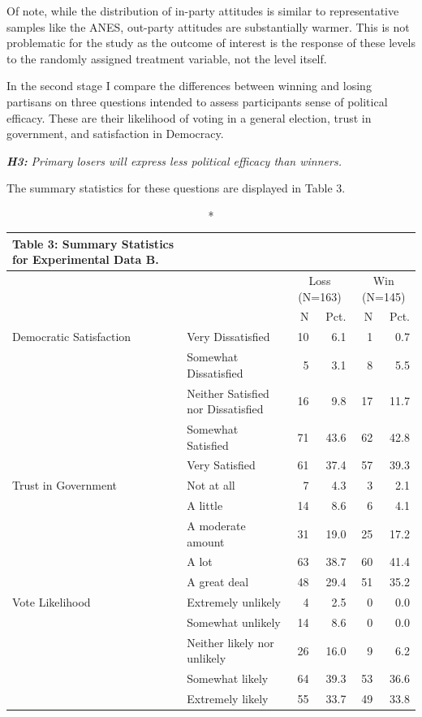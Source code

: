 \documentclass[
]{article}
\begin{document}
Of note, while the distribution of in-party attitudes is similar to representative samples like the ANES, out-party attitudes are substantially warmer. This is not problematic for the study as the outcome of interest is the response of these levels to the randomly assigned treatment variable, not the level itself.

In the second stage I compare the differences between winning and losing partisans on three questions intended to assess participants sense of political efficacy. These are their likelihood of voting in a general election, trust in government, and satisfaction in Democracy.

\textbf{\emph{H3:}} \emph{Primary losers will express less political efficacy than winners.}

The summary statistics for these questions are displayed in Table 3.

\clearpage

\captionsetup[table]{labelformat=empty,skip=1pt}
\begin{longtable}{llrrrr}
\caption*{
{\large \textbf{Table 3:} Summary Statistics for Experimental Data B.}
} \\ 
\toprule
 &  & \multicolumn{2}{c}{Loss (N=163)} & \multicolumn{2}{c}{Win (N=145)} \\ 
 \cmidrule(lr){3-4} \cmidrule(lr){5-6}
  &    & N & Pct. & N  & Pct.  \\ 
\midrule
Democratic Satisfaction & Very Dissatisfied & 10 & 6.1 & 1 & 0.7 \\ 
 & Somewhat Dissatisfied & 5 & 3.1 & 8 & 5.5 \\ 
 & Neither Satisfied nor Dissatisfied & 16 & 9.8 & 17 & 11.7 \\ 
 & Somewhat Satisfied & 71 & 43.6 & 62 & 42.8 \\ 
 & Very Satisfied & 61 & 37.4 & 57 & 39.3 \\ 
Trust in Government & Not at all & 7 & 4.3 & 3 & 2.1 \\ 
 & A little & 14 & 8.6 & 6 & 4.1 \\ 
 & A moderate amount & 31 & 19.0 & 25 & 17.2 \\ 
 & A lot & 63 & 38.7 & 60 & 41.4 \\ 
 & A great deal & 48 & 29.4 & 51 & 35.2 \\ 
Vote Likelihood & Extremely unlikely & 4 & 2.5 & 0 & 0.0 \\ 
 & Somewhat unlikely & 14 & 8.6 & 0 & 0.0 \\ 
 & Neither likely nor unlikely & 26 & 16.0 & 9 & 6.2 \\ 
 & Somewhat likely & 64 & 39.3 & 53 & 36.6 \\ 
 & Extremely likely & 55 & 33.7 & 49 & 33.8 \\ 
 \bottomrule
\end{longtable}
\end{document}
